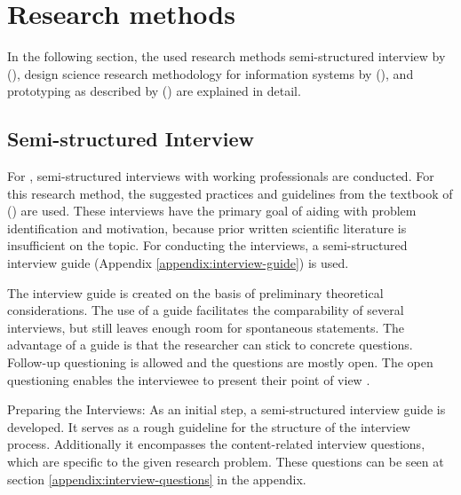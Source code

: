 \section{Research methods}

In the following section,
the used research methods
semi-structured interview
by
\citeauthor{glaser2010experteninterviews} (\citeyear{glaser2010experteninterviews}),
design science research methodology for information systems
by
\citeauthor{designScienceResearchMethodologyForInformationSystemsResearch} (\citeyear{designScienceResearchMethodologyForInformationSystemsResearch}),
and prototyping as described
by
\citeauthor{riedlManagementInformatik2019} (\citeyear{riedlManagementInformatik2019})
are explained in detail.





\subsection{Semi-structured Interview}\label{methodology:interview}

For ,
semi-structured interviews with working professionals
are conducted.
For this research method,
the suggested practices and guidelines from
the textbook of
\citeauthor{glaser2010experteninterviews} (\citeyear{glaser2010experteninterviews})
are used.
These interviews have the primary goal of aiding with
problem identification and motivation,
because prior written scientific literature is insufficient on the topic.
For conducting the interviews,
a semi-structured interview guide (Appendix \ref{appendix:interview-guide}) is used.

The interview guide is created on the basis of preliminary theoretical considerations.
The use of a guide facilitates the comparability of several interviews,
but still leaves enough room for spontaneous statements.
The advantage of a guide is that the researcher can stick to concrete questions.
Follow-up questioning is allowed and the questions are mostly open.
The open questioning enables the interviewee to present their point of view
\autocite{berger2016wissenschaftliches}.



Preparing the Interviews:
As an initial step,
a semi-structured interview guide is developed.
It serves as a rough guideline for the structure of the interview process.
Additionally it encompasses the content-related interview questions,
which are specific to the given research problem.
These questions can be seen at section \ref{appendix:interview-questions} in the appendix.

